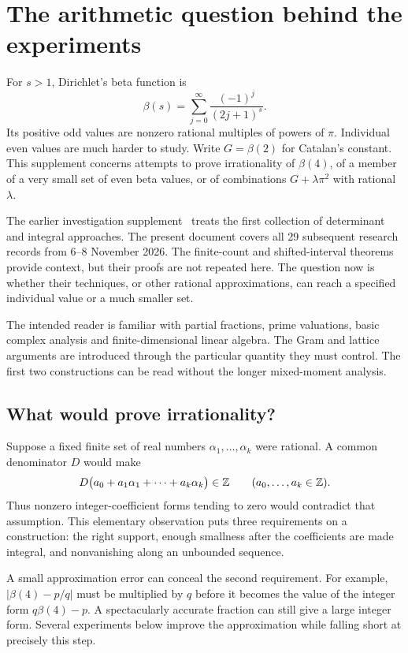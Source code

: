 \section{The arithmetic question behind the experiments}
For $s>1$, Dirichlet's beta function is
\[
 \beta(s)=\sum_{j=0}^{\infty}\frac{(-1)^j}{(2j+1)^s}.
\]
Its positive odd values are nonzero rational multiples of powers of
$\pi$. Individual even values are much harder to study. Write
$G=\beta(2)$ for Catalan's constant. This supplement concerns attempts
to prove irrationality of $\beta(4)$, of a member of a very small set
of even beta values, or of combinations $G+\lambda\pi^2$ with rational
$\lambda$.

The earlier investigation supplement~\cite{firstsupp} treats the first
collection of determinant and integral approaches. The present document
covers all 29 subsequent research records from 6--8 November 2026.
The finite-count and
shifted-interval theorems~\cite{count,shifted} provide context, but their
proofs are not repeated here. The question now is whether their techniques,
or other rational approximations, can reach a specified individual value
or a much smaller set.

The intended reader is familiar with partial fractions, prime valuations,
basic complex analysis and finite-dimensional linear algebra. The Gram
and lattice arguments are introduced through the particular quantity
they must control. The first two constructions can be read without the
longer mixed-moment analysis.

\subsection{What would prove irrationality?}
Suppose a fixed finite set of real numbers $\alpha_1,\ldots,\alpha_k$
were rational. A common denominator $D$ would make
\[
 D\bigl(a_0+a_1\alpha_1+\cdots+a_k\alpha_k\bigr)\in\mathbb Z
 \qquad(a_0,\ldots,a_k\in\mathbb Z).
\]
Thus nonzero integer-coefficient forms tending to zero would contradict
that assumption. This elementary observation puts three requirements
on a construction: the right support, enough smallness after the
coefficients are made integral, and nonvanishing along an unbounded
sequence.

A small approximation error can conceal the second requirement.
For example, $|\beta(4)-p/q|$ must be multiplied by $q$ before it becomes
the value of the integer form $q\beta(4)-p$. A spectacularly accurate
fraction can still give a large integer form. Several experiments below
improve the approximation while falling short at precisely this step.

